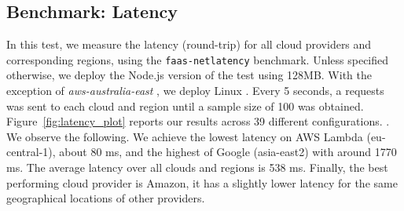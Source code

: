 \subsection{Benchmark: Latency}
In this test, we measure the latency (round-trip) for all cloud providers and corresponding regions, using the \texttt{faas-netlatency} benchmark.
Unless specified otherwise, we deploy the Node.js version of the test using 128\gls{MB}.
With the exception of \textit{aws-australia-east} , we deploy Linux   .   
Every 5 seconds, a requests was sent to each cloud and region until a sample size of 100 was obtained. 
Figure~\ref{fig:latency_plot} reports our results across 39 different configurations. 
. 
We observe the following.
We achieve the lowest latency on AWS Lambda (eu-central-1), about 80 ms, and the highest of Google (asia-east2) with around 1770 ms. 
The average latency over all clouds and regions is 538 ms.
Finally, the best performing cloud provider is Amazon, it has a slightly lower latency for the same geographical locations of other providers.

